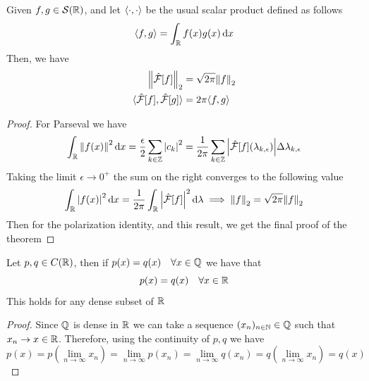 \documentclass[../complete.tex]{subfiles}
\begin{document}
\begin{thm}[Plancherel]
	Given $f,g\in\Sp(\R)$, and let $\sprd$ be the usual scalar product defined as follows
	\begin{equation*}
		\spr{f}{g}=\int_{\R}^{}f(x)g(x)\diff x
	\end{equation*}
	Then, we have
	\begin{equation}
		\begin{aligned}
			\pnorm[2]{\fou[f]}&=\sqrt{2\pi}\pnorm[2]{f}\\
			\spr{\fou[f]}{\fou[g]}&=2\pi\spr{f}{g}
		\end{aligned}
		\label{eq:planchthm}
	\end{equation}
\end{thm}
\begin{proof}
	For Parseval we have
	\begin{equation*}
		\int_{\R}^{}\norm{f(x)}^2\diff x=\frac{\epsilon}{2}\sum_{k\in\Z}^{}\abs{c_k}^2=\frac{1}{2\pi}\sum_{k\in\Z}^{}\abs{\fou[f](\lambda_{k,\epsilon})}\Delta\lambda_{k,\epsilon}
	\end{equation*}
	Taking the limit $\epsilon\to0^+$ the sum on the right converges to the following value
	\begin{equation*}
		\int_{\R}^{}\abs{f(x)}^2\diff x=\frac{1}{2\pi}\int_{\R}^{}\abs{\fou[f]}^2\diff\lambda\implies{}\pnorm[2]{f}=\sqrt{2\pi}\pnorm[2]{f}
	\end{equation*}
	Then for the polarization identity, and this result, we get the final proof of the theorem
\end{proof}
\begin{thm}
	Let $p,q\in C(\R)$, then if $p(x)=q(x)\quad\forall x\in\Q$ we have that
	\begin{equation*}
		p(x)=q(x)\quad\forall x\in\R
	\end{equation*}
	This holds for any dense subset of $\R$
\end{thm}
\begin{proof}
	Since $\Q$ is dense in $\R$ we can take a sequence $(x_n)_{n\in\N}\in\Q$ such that $x_n\to x\in\R$. Therefore, using the continuity of $p,q$ we have
	\begin{equation*}
		p(x)=p\left( \lim_{n\to\infty}x_n \right)=\lim_{n\to\infty}p(x_n)=\lim_{n\to\infty}q(x_n)=q\left( \lim_{n\to\infty}x_n \right)=q(x)
	\end{equation*}
\end{proof}
\end{document}
